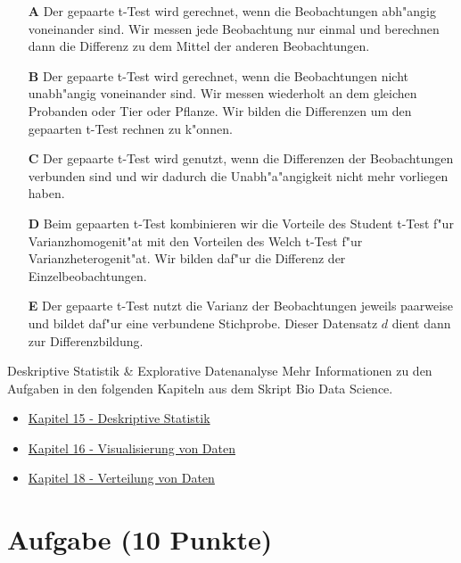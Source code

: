 \documentclass[a4paper, 10pt]{scrartcl}\usepackage[]{graphicx}\usepackage[]{xcolor}
\begin{document}
\begin{enumerate}
\item [\textbf{A} \msquare] Der gepaarte t-Test wird gerechnet, wenn die Beobachtungen abh{"a}ngig voneinander sind. Wir messen jede Beobachtung nur einmal und berechnen dann die Differenz zu dem Mittel der anderen Beobachtungen.
\item [\textbf{B} \msquare] Der gepaarte t-Test wird gerechnet, wenn die Beobachtungen nicht unabh{"a}ngig voneinander sind. Wir messen wiederholt an dem gleichen Probanden oder Tier oder Pflanze. Wir bilden die Differenzen um den gepaarten t-Test rechnen zu k{"o}nnen.
\item [\textbf{C} \msquare] Der gepaarte t-Test wird genutzt, wenn die Differenzen der Beobachtungen verbunden sind und wir dadurch die Unabh{"a}{"a}ngigkeit nicht mehr vorliegen haben.
\item [\textbf{D} \msquare] Beim gepaarten t-Test kombinieren wir die Vorteile des Student t-Test f{"u}r Varianzhomogenit{"a}t mit den Vorteilen des Welch t-Test f{"u}r Varianzheterogenit{"a}t. Wir bilden daf{"u}r die Differenz der Einzelbeobachtungen.
\item [\textbf{E} \msquare] Der gepaarte t-Test nutzt die Varianz der Beobachtungen jeweils paarweise und bildet daf{"u}r eine verbundene Stichprobe. Dieser Datensatz $d$ dient dann zur Differenzbildung.
\end{enumerate}
\clearpage
\begin{graybox}{Deskriptive Statistik \& Explorative Datenanalyse}
Mehr Informationen zu den Aufgaben in den folgenden Kapiteln aus dem Skript Bio Data Science.
  \begin{itemize}
  \item \href{https://jkruppa.github.io/eda-descriptive.html}{Kapitel 15 - Deskriptive Statistik}
  \item \href{https://jkruppa.github.io/eda-ggplot.html}{Kapitel 16 - Visualisierung von Daten}
  \item \href{https://jkruppa.github.io/eda-distribution.html}{Kapitel 18 - Verteilung von Daten}
  \end{itemize}
\end{graybox}
\clearpage

\section{Aufgabe \hfill (10 Punkte)}
\end{document}

